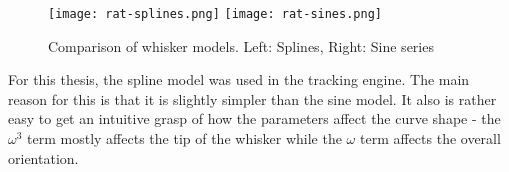 \begin{figure}
  \centering
  \texttt{[image: rat-splines.png]}
  \texttt{[image: rat-sines.png]}
  \caption{Comparison of whisker models. Left: Splines, Right: Sine series}
  \label{fig:model-comparison}
\end{figure}

For this thesis, the spline model was used in the tracking engine. The
main reason for this is that it is slightly simpler than the sine
model. It also is rather easy to get an intuitive grasp of how the
parameters affect the curve shape - the $\omega^3$ term mostly affects
the tip of the whisker while the $\omega$ term affects the overall
orientation.
